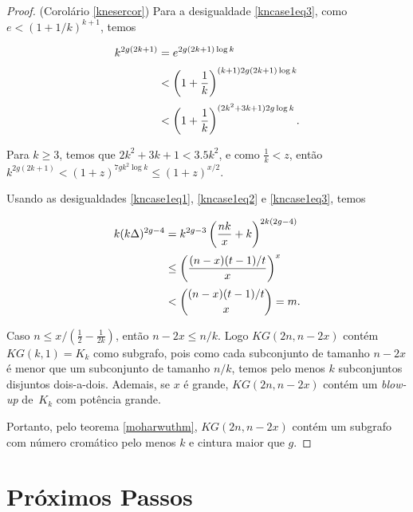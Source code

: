 \documentclass{article}
\begin{document}
\begin{proof}{(Corolário \ref{knesercor})}
Para a desigualdade \ref{kncase1eq3}, como $e < (1+1/k)^{k+1}$, temos

\begin{equation*}
\setlength{\jot}{5pt}
\begin{aligned}
k^{2g(2k+1)} & = e^{2g(2k+1)\log k}\\
& < \left(1+\frac{1}{k}\right)^{(k+1)2g(2k+1)\log k}\\
& < \left(1+\frac{1}{k}\right)^{(2k^2+3k+1)2g\log k}.
\end{aligned}
\end{equation*}

Para $k \geq 3$, temos que $2k^2+3k+1<3.5k^2$, e como $\frac{1}{k} < z$, então $k^{2g(2k+1)} < (1+z)^{7gk^2\log k} \leq (1+z)^{x/2}$.

Usando as desigualdades \ref{kncase1eq1}, \ref{kncase1eq2} e \ref{kncase1eq3}, temos

\begin{equation*}
\setlength{\jot}{5pt}
\begin{aligned}
k(k\Delta)^{2g-4} & = k^{2g-3}\left(\frac{nk}{x}+k\right)^{2k(2g-4)} \\
 & \leq \left(\frac{(n-x)(t-1)/t}{x}\right)^x \\
 & < \binom{(n-x)(t-1)/t}{x} = m.
\end{aligned}
\end{equation*}


Caso $n \leq x/(\frac{1}{2} - \frac{1}{2k})$, então $n-2x \leq n/k$. Logo $KG(2n,n-2x)$ contém $KG(k,1) = K_k$ como subgrafo, pois como cada subconjunto de tamanho $n-2x$ é menor que um subconjunto de tamanho $n/k$, temos pelo menos $k$ subconjuntos disjuntos dois-a-dois. Ademais, se $x$ é grande, $KG(2n,n-2x)$ contém um \textit{blow-up} de~$K_k$ com potência grande.

Portanto, pelo teorema \ref{moharwuthm}, $KG(2n,n-2x)$ contém um subgrafo com número cromático pelo menos $k$ e cintura maior que $g$.
\end{proof}

\section{Próximos Passos}




\endgroup %
\end{document}
